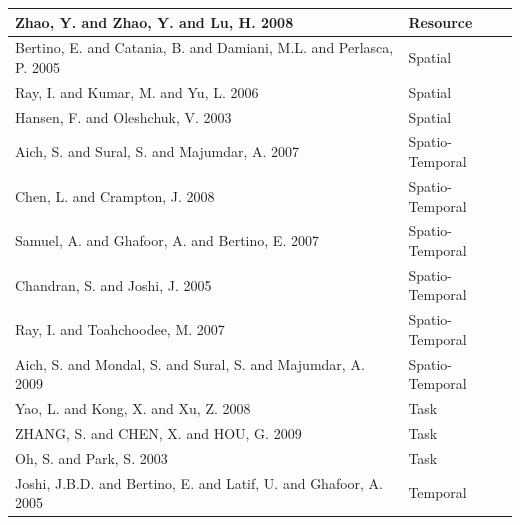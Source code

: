 \documentclass[letterpaper,10pt,english]{sphinxmanual}
\begin{document}
\begin{tabulary}{\linewidth}{|L|L|}
Zhao, Y. and Zhao, Y. and Lu, H. 2008
 & 
Resource
\\\hline

Bertino, E. and Catania, B. and Damiani, M.L. and Perlasca, P. 2005
 & 
Spatial
\\\hline

Ray, I. and Kumar, M. and Yu, L. 2006
 & 
Spatial
\\\hline

Hansen, F. and Oleshchuk, V. 2003
 & 
Spatial
\\\hline

Aich, S. and Sural, S. and Majumdar, A. 2007
 & 
Spatio-Temporal
\\\hline

Chen, L. and Crampton, J. 2008
 & 
Spatio-Temporal
\\\hline

Samuel, A. and Ghafoor, A. and Bertino, E. 2007
 & 
Spatio-Temporal
\\\hline

Chandran, S. and Joshi, J. 2005
 & 
Spatio-Temporal
\\\hline

Ray, I. and Toahchoodee, M. 2007
 & 
Spatio-Temporal
\\\hline

Aich, S. and Mondal, S. and Sural, S. and Majumdar, A. 2009
 & 
Spatio-Temporal
\\\hline

Yao, L. and Kong, X. and Xu, Z. 2008
 & 
Task
\\\hline

ZHANG, S. and CHEN, X. and HOU, G. 2009
 & 
Task
\\\hline

Oh, S. and Park, S. 2003
 & 
Task
\\\hline

Joshi, J.B.D. and Bertino, E. and Latif, U. and Ghafoor, A. 2005
 & 
Temporal
\\\hline
\end{tabulary}
\end{document}
